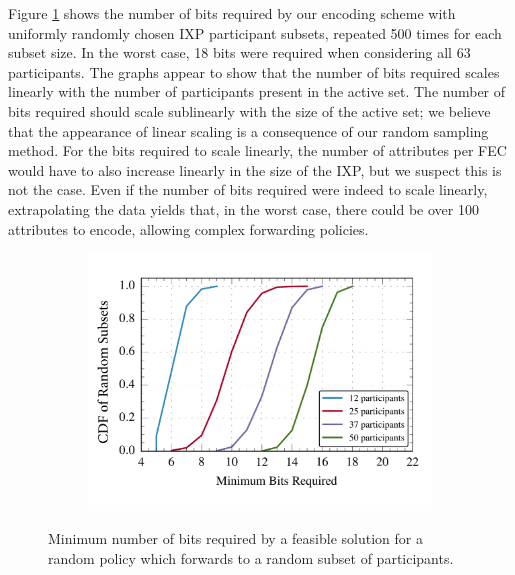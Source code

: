 Figure \ref{fig:bits} shows the number of bits required by our encoding
scheme with uniformly randomly chosen IXP participant subsets, repeated
500 times for each subset size. In the worst case, 18 bits were required
when considering all 63 participants. The graphs appear to show that the
number of bits required scales linearly with the number of participants
present in the active set. The number of bits required should scale
sublinearly with the size of the active set; we believe that the appearance of
linear scaling is a consequence of our random sampling method. 
For the bits required to scale linearly, the number of attributes per
FEC would have to also increase linearly in the size of the IXP, but we
suspect this is not the case. Even if the number of bits required were
indeed to scale linearly, extrapolating the data yields that, in
the worst case, there could be over 100 attributes to encode, allowing
complex forwarding policies. 

\begin{figure}[t!] 
\begin{minipage}{1\linewidth}
\begin{subfigure}[b]{0.96\linewidth}
\includegraphics[width=\linewidth]{figures/bit_counts}
\end{subfigure} 
\end{minipage} 
\caption{Minimum number of bits required by a feasible solution for a random policy which forwards to a random subset of participants.}
\label{fig:bits}
\end{figure}



